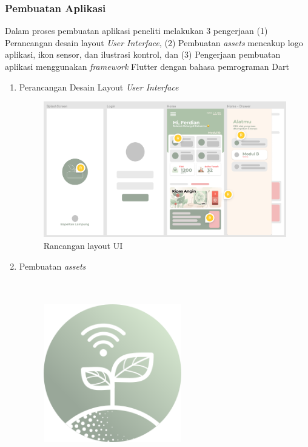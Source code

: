 \begin{flushleft}
\begin{justify}
        \subsubsection{Pembuatan Aplikasi}
        Dalam proses pembuatan aplikasi peneliti melakukan 3 pengerjaan (1) Perancangan desain layout \textit{User Interface}, (2) Pembuatan \textit{assets} mencakup logo aplikasi, ikon sensor, dan ilustrasi kontrol, dan (3) Pengerjaan pembuatan aplikasi menggunakan \textit{framework} Flutter dengan bahasa pemrograman Dart
        \begin{enumerate}
            \item Perancangan Desain Layout \textit{User Interface}
            \begin{figure}[ht]
                \centering
                \includegraphics[width=15cm]{images/UI/summary.png}
                \caption{Rancangan layout UI}
            \end{figure}
            \vspace{10cm}
            \item Pembuatan \textit{assets}\\\\\\
            \begin{figure}[ht]
                \centering
                \includegraphics[width=6cm]{images/logo.png}

\end{figure}
\end{enumerate}
\end{justify}
\end{flushleft}
